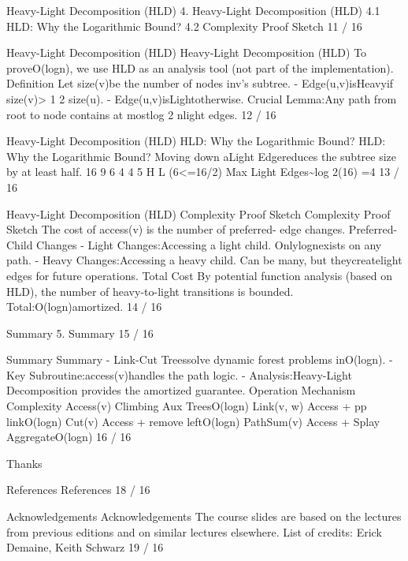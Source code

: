 \begin{description}[leftmargin=!,labelwidth=4.2em,style=nextline]
\item[Pag. 11] Heavy-Light Decomposition (HLD) 4. Heavy-Light Decomposition (HLD) 4.1 HLD: Why the Logarithmic Bound? 4.2 Complexity Proof Sketch 11 / 16
\item[Pag. 12] Heavy-Light Decomposition (HLD) Heavy-Light Decomposition (HLD) To proveO(logn), we use HLD as an analysis tool (not part of the implementation). Definition Let size(v)be the number of nodes inv's subtree. - Edge(u,v)isHeavyif size(v)> 1 2 size(u). - Edge(u,v)isLightotherwise. Crucial Lemma:Any path from root to node contains at mostlog 2 nlight edges. 12 / 16
\item[Pag. 13] Heavy-Light Decomposition (HLD) HLD: Why the Logarithmic Bound? HLD: Why the Logarithmic Bound? Moving down aLight Edgereduces the subtree size by at least half. 16 9 6 4 4 5 H L (6<=16/2) Max Light Edges\textasciitilde{}log 2(16) =4 13 / 16
\item[Pag. 14] Heavy-Light Decomposition (HLD) Complexity Proof Sketch Complexity Proof Sketch The cost of access(v) is the number of preferred- edge changes. Preferred-Child Changes - Light Changes:Accessing a light child. Onlylognexists on any path. - Heavy Changes:Accessing a heavy child. Can be many, but theycreatelight edges for future operations. Total Cost By potential function analysis (based on HLD), the number of heavy-to-light transitions is bounded. Total:O(logn)amortized. 14 / 16
\item[Pag. 15] Summary 5. Summary 15 / 16
\item[Pag. 16] Summary Summary - Link-Cut Treessolve dynamic forest problems inO(logn). - Key Subroutine:access(v)handles the path logic. - Analysis:Heavy-Light Decomposition provides the amortized guarantee. Operation Mechanism Complexity Access(v) Climbing Aux TreesO(logn) Link(v, w) Access + pp linkO(logn) Cut(v) Access + remove leftO(logn) PathSum(v) Access + Splay AggregateO(logn) 16 / 16
\item[Pag. 17] Thanks
\item[Pag. 18] References References 18 / 16
\item[Pag. 19] Acknowledgements Acknowledgements The course slides are based on the lectures from previous editions and on similar lectures elsewhere. List of credits: Erick Demaine, Keith Schwarz 19 / 16
\end{description}
